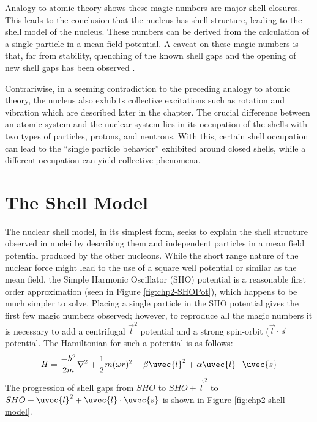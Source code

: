 Analogy to atomic theory shows these magic numbers are major shell closures. This leads to the conclusion that the nucleus has shell structure, leading to the shell model of the nucleus. These numbers can be derived from the calculation of a single particle in a mean field potential. A caveat on these magic numbers is that, far from stability, quenching of the known shell gaps and the opening of new shell gaps has been observed \cite{changingShells}.

Contrariwise, in a seeming contradiction to the preceding analogy to atomic theory, the nucleus also exhibits collective excitations such as rotation and vibration which are described later in the chapter. The crucial difference between an atomic system and the nuclear system lies in its occupation of the shells with two types of particles, protons, and neutrons. With this, certain shell occupation can lead to the ``single particle behavior'' exhibited around closed shells, while a different occupation can yield collective phenomena.

\section{The Shell Model}
\label{sec:models-shell-model}
The nuclear shell model, in its simplest form, seeks to explain the shell structure observed in nuclei by describing them and independent particles in a mean field potential produced by the other nucleons. While the short range nature of the nuclear force might lead to the use of a square well potential or similar as the mean field, the Simple Harmonic Oscillator (SHO) potential is a reasonable first order approximation (seen in Figure \ref{fig:chp2-SHOPot}), which happens to be much simpler to solve. Placing a single particle in the SHO potential gives the first few magic numbers observed; however, to reproduce all the magic numbers it is necessary to add a centrifugal $\vec{l}^2$ potential and a strong spin-orbit ($\vec{l}\cdot\vec{s}$ potential. The Hamiltonian for such a potential is as follows:
\begin{equation}
\label{eqn:chp2-sm-sho-hamil}
\mathbf{\mathit{H}} = \frac{-\hbar^2}{2m}\nabla^2 + \frac{1}{2}m(\omega r)^2 + \beta \uvec{l}^2 + \alpha \uvec{l}\cdot{}\uvec{s}
\end{equation}
The progression of shell gaps from $SHO$ to $SHO + \vec{l}^2$ to $SHO + \uvec{l}^2 + \uvec{l}\cdot\uvec{s}$ is shown in Figure \ref{fig:chp2-shell-model}.

